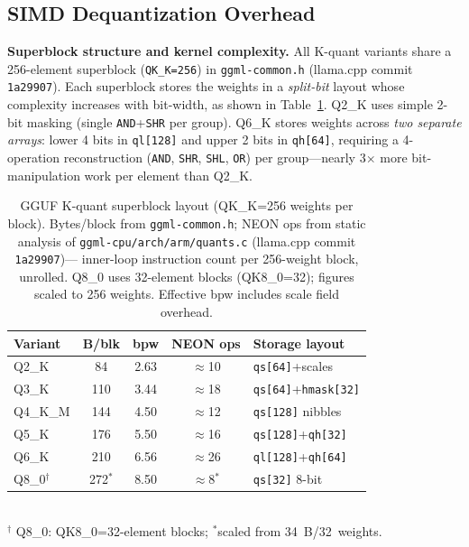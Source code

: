 \documentclass[conference]{IEEEtran}
\begin{document}
\subsection{SIMD Dequantization Overhead}
\label{sec:nonmonotonic}

\textbf{Superblock structure and kernel complexity.}
All K-quant variants share a 256-element superblock (\texttt{QK\_K=256}) in
\texttt{ggml-common.h} (llama.cpp commit \texttt{1a29907}).
Each superblock stores the weights in a \emph{split-bit} layout whose complexity
increases with bit-width, as shown in Table~\ref{tab:superblock}.
Q2\_K uses simple 2-bit masking (single \texttt{AND}+\texttt{SHR} per group).
Q6\_K stores weights across \emph{two separate arrays}: lower 4 bits in \texttt{ql[128]}
and upper 2 bits in \texttt{qh[64]}, requiring a 4-operation reconstruction
(\texttt{AND}, \texttt{SHR}, \texttt{SHL}, \texttt{OR}) per group---nearly
3$\times$ more bit-manipulation work per element than Q2\_K.

\begin{table}[h]
\centering
\caption{GGUF K-quant superblock layout (QK\_K=256 weights per block).
Bytes/block from \texttt{ggml-common.h}; NEON ops from static analysis of
\texttt{ggml-cpu/arch/arm/quants.c} (llama.cpp commit \texttt{1a29907})---
inner-loop instruction count per 256-weight block, unrolled.
Q8\_0 uses 32-element blocks (QK8\_0=32); figures scaled to 256 weights.
Effective bpw includes scale field overhead.}
\label{tab:superblock}
\setlength{\tabcolsep}{3pt}
\small
\begin{tabular}{lcccl}
\toprule
Variant & B/blk & bpw & NEON ops & Storage layout \\
\midrule
Q2\_K   & 84  & 2.63 & $\approx$10 & \texttt{qs[64]}+scales \\
Q3\_K   & 110 & 3.44 & $\approx$18 & \texttt{qs[64]}+\texttt{hmask[32]} \\
Q4\_K\_M & 144 & 4.50 & $\approx$12 & \texttt{qs[128]} nibbles \\
Q5\_K   & 176 & 5.50 & $\approx$16 & \texttt{qs[128]}+\texttt{qh[32]} \\
Q6\_K   & 210 & 6.56 & $\approx$26 & \texttt{ql[128]}+\texttt{qh[64]} \\
Q8\_0$^\dagger$ & 272$^*$ & 8.50 & $\approx$8$^*$ & \texttt{qs[32]} 8-bit \\
\bottomrule
\end{tabular}
\smallskip\\
$^\dagger$ Q8\_0: QK8\_0=32-element blocks; $^*$scaled from 34~B/32~weights.
\end{table}
\end{document}
